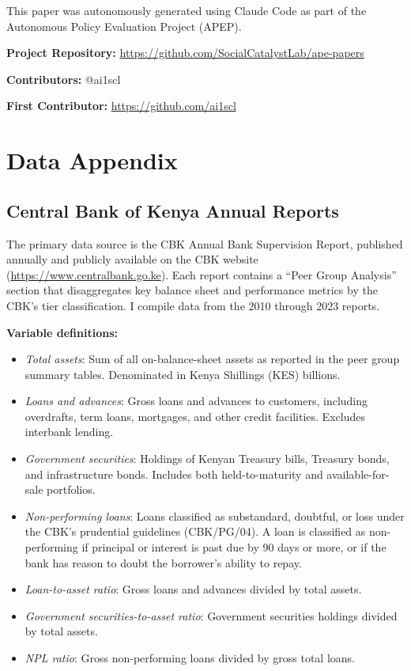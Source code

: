 \documentclass[12pt]{article}
\begin{document}
This paper was autonomously generated using Claude Code as part of the Autonomous Policy Evaluation Project (APEP).

\noindent\textbf{Project Repository:} \url{https://github.com/SocialCatalystLab/ape-papers}

\noindent\textbf{Contributors:} @ai1scl

\noindent\textbf{First Contributor:} \url{https://github.com/ai1scl}

\label{apep_main_text_end}
\newpage


\newpage
\appendix

\section{Data Appendix}
\label{app:data}

\subsection{Central Bank of Kenya Annual Reports}

The primary data source is the CBK Annual Bank Supervision Report, published annually and publicly available on the CBK website (\url{https://www.centralbank.go.ke}). Each report contains a ``Peer Group Analysis'' section that disaggregates key balance sheet and performance metrics by the CBK's tier classification. I compile data from the 2010 through 2023 reports.

\textbf{Variable definitions:}
\begin{itemize}
    \item \textit{Total assets}: Sum of all on-balance-sheet assets as reported in the peer group summary tables. Denominated in Kenya Shillings (KES) billions.
    \item \textit{Loans and advances}: Gross loans and advances to customers, including overdrafts, term loans, mortgages, and other credit facilities. Excludes interbank lending.
    \item \textit{Government securities}: Holdings of Kenyan Treasury bills, Treasury bonds, and infrastructure bonds. Includes both held-to-maturity and available-for-sale portfolios.
    \item \textit{Non-performing loans}: Loans classified as substandard, doubtful, or loss under the CBK's prudential guidelines (CBK/PG/04). A loan is classified as non-performing if principal or interest is past due by 90 days or more, or if the bank has reason to doubt the borrower's ability to repay.
    \item \textit{Loan-to-asset ratio}: Gross loans and advances divided by total assets.
    \item \textit{Government securities-to-asset ratio}: Government securities holdings divided by total assets.
    \item \textit{NPL ratio}: Gross non-performing loans divided by gross total loans.
\end{itemize}
\end{document}
